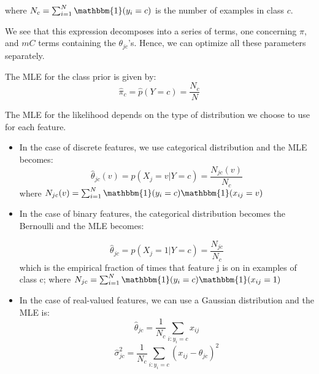 \documentclass[12pt, a4paper]{article}
\theoremstyle{definition}
\numberwithin{figure}{section}
\numberwithin{equation}{section}
\numberwithin{table}{section}
\begin{document}
where $N_c = \sum_{i=1}^N \mathbbm{1}(y_i = c)$ is the number of examples in class $c$.

We see that this expression decomposes into a series of terms, one concerning $\pi$, and $mC$ terms containing the $\theta_{jc}$'s. Hence, we can optimize all these parameters separately.

The MLE for the class prior is given by:
\begin{equation}
    \label{ex:mle-naive-bayes1}
    \hat{\pi}_c = \hat{p}(Y=c) = \frac{N_c}{N}
\end{equation}


The MLE for the likelihood depends on the type of distribution we choose to use for each feature.

\begin{itemize}
    \item In the case of discrete features, we use categorical distribution and the MLE becomes:
    \begin{equation}
        \label{ex:mle-naive-bayes2}
    \hat{\theta}_{jc}(v) = p(X_j=v|Y=c) = \frac{N_{jc}(v)}{N_c}
    \end{equation}
    where $N_{jc}(v)=\sum_{i=1}^N \mathbbm{1}(y_i=c)\mathbbm{1}(x_{ij}=v)$

    \item In the case of binary features, the categorical distribution becomes the Bernoulli and the MLE becomes:

    \begin{equation}
        \label{ex:mle-naive-bayes3}
    \hat{\theta}_{jc} = p(X_j=1|Y=c) = \frac{N_{jc}}{N_c}
    \end{equation}
    which is the empirical fraction of times that feature j is on in examples of class c; where $N_{jc}=\sum_{i=1}^N \mathbbm{1}(y_i=c)\mathbbm{1}(x_{ij}=1)$

    \item In the case of real-valued features, we can use a Gaussian distribution and the MLE is:
    \begin{equation}
        \label{ex:mle-naive-bayes4}
        \hat{\theta}_{jc} = \frac{1}{N_c}\sum_{i:y_i=c} x_{ij}
    \end{equation}
    \begin{equation}
        \label{ex:mle-naive-bayes4}
        \hat{\sigma}^2_{jc} = \frac{1}{N_c} \sum_{i:y_i=c} (x_{ij}-\hat{\theta}_{jc})^2
    \end{equation}

\end{itemize}
\end{document}
